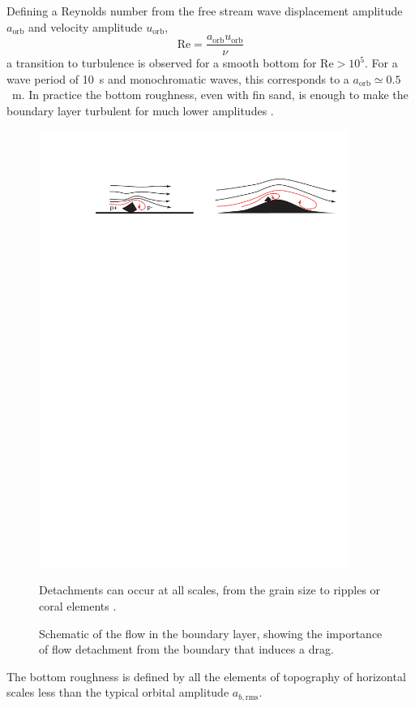 Defining a Reynolds number from the free stream wave displacement amplitude $a_{\mathrm{orb}}$ and 
velocity amplitude $u_{\mathrm{orb}}$, 
\begin{equation}
 \mathrm{Re} = \frac{a_{\mathrm{orb}} u_{\mathrm{orb}}}{\nu}
\end{equation}
a transition to turbulence is observed for a smooth bottom for $\mathrm{Re} > 10^5$. For a wave period
of 10~s and monochromatic waves, this corresponds to a $a_{\mathrm{orb}} \simeq 0.5$~m. 
In practice the bottom roughness, even with fin sand, is enough to make the boundary layer turbulent 
for much lower amplitudes \citep{Jonsson1967}.
\begin{figure}
\centerline{\includegraphics[width=0.9\textwidth]{FIGS_CH_BBL/decollement.pdf}}
  \caption{Schematic of the flow in the boundary layer, showing the 
  importance of flow detachment from the boundary that induces a drag.}
  {Detachments can occur at all scales, from the grain size to ripples or coral elements \citep[e.g.][]{Monismith&al.2015}.}
   \label{fig_decollement}
\end{figure}
The bottom roughness is defined 
by all the elements of topography of horizontal scales less than the typical 
orbital amplitude $a_{b,{\mathrm{rms}}}$.

